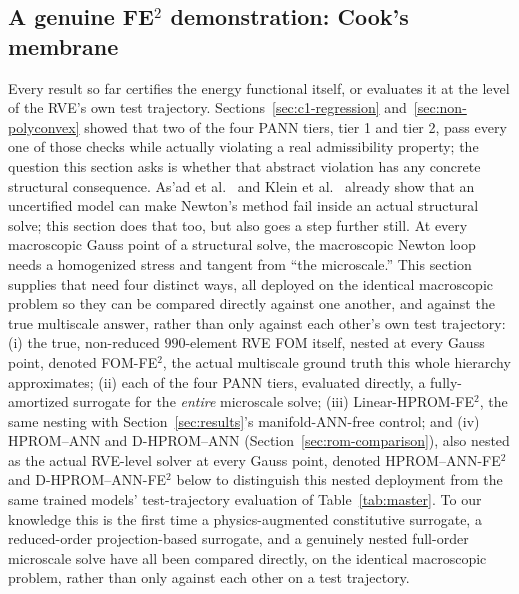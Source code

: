 \documentclass[10pt,a4paper]{article}
\begin{document}
\subsection{A genuine FE\texorpdfstring{$^2$}{\textsuperscript{2}} demonstration: Cook's membrane}
\label{sec:cook}
Every result so far certifies the energy functional itself, or evaluates
it at the level of the RVE's own test trajectory. Sections~\ref{sec:c1-regression}
and~\ref{sec:non-polyconvex} showed that two of the four PANN tiers,
tier 1 and tier 2, pass every one of those checks while actually violating
a real admissibility property; the question this section asks is whether
that abstract violation has any concrete structural consequence. As'ad et
al.~\cite{Asad2022} and Klein et al.~\cite{Klein2022} already show that an
uncertified model can make Newton's method fail inside an actual structural
solve; this section does that too, but also goes a step further still. At every macroscopic Gauss point of a
structural solve, the macroscopic Newton loop needs a homogenized stress
and tangent from ``the microscale.'' This section supplies that need
four distinct ways, all deployed on the identical macroscopic problem so
they can be compared directly against one another, and against the true
multiscale answer, rather than only against each other's own test
trajectory: (i) the true, non-reduced $990$-element RVE FOM itself,
nested at every Gauss point, denoted FOM-FE$^2$, the actual multiscale
ground truth this whole hierarchy approximates; (ii) each of the four
PANN tiers, evaluated directly, a fully-amortized surrogate for the
\emph{entire} microscale solve; (iii) Linear-HPROM-FE$^2$, the same
nesting with Section~\ref{sec:results}'s manifold-ANN-free control; and
(iv) HPROM--ANN and D-HPROM--ANN (Section~\ref{sec:rom-comparison}),
also nested as the actual RVE-level solver at every Gauss point, denoted
HPROM--ANN-FE$^2$ and D-HPROM--ANN-FE$^2$ below to distinguish this
nested deployment from the same trained models' test-trajectory
evaluation of Table~\ref{tab:master}. To our knowledge this is the first time a
physics-augmented constitutive surrogate, a reduced-order projection-based
surrogate, and a genuinely nested full-order microscale solve have all
been compared directly, on the identical macroscopic problem, rather than
only against each other on a test trajectory.
\end{document}
